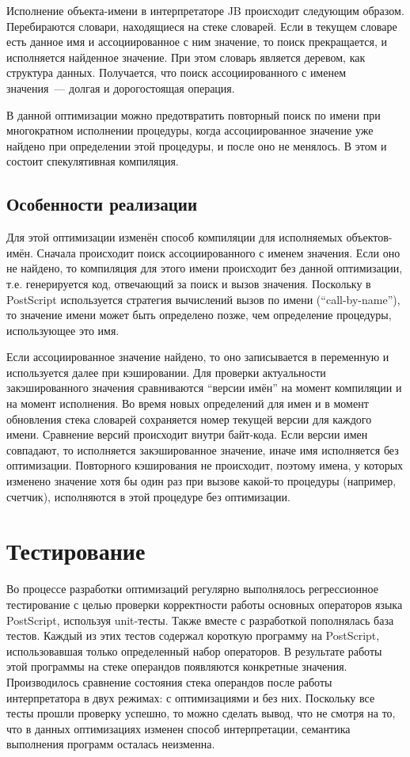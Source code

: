 	Исполнение объекта-имени в интерпретаторе JB происходит следующим образом. Перебираются словари, находящиеся на стеке словарей. Если в текущем словаре есть данное имя и ассоциированное с ним значение, то поиск прекращается, и исполняется найденное значение. При этом словарь является деревом, как структура данных. Получается, что поиск ассоциированного с именем значения~--- долгая и дорогостоящая операция. 
	
	В данной оптимизации можно предотвратить повторный поиск по имени при многократном исполнении процедуры, когда  ассоциированное значение уже найдено при определении этой процедуры, и после оно не менялось. В этом и состоит спекулятивная компиляция.
	
	\subsection{Особенности реализации}
	Для этой оптимизации изменён способ компиляции для исполняемых объектов-имён. Сначала происходит поиск ассоциированного с именем значения. Если оно не найдено, то компиляция для этого имени происходит без данной оптимизации, т.е. генерируется код, отвечающий за поиск и вызов значения. Поскольку в PostScript используется стратегия вычислений вызов по имени (``call-by-name''), то значение имени может быть определено позже, чем определение процедуры, использующее это имя.
	
	Если ассоциированное значение найдено, то оно записывается в переменную и используется далее при кэшировании.
	Для проверки актуальности закэшированного значения сравниваются ``версии имён'' на момент компиляции и на момент исполнения. Во время новых определений для имен и в момент обновления стека словарей сохраняется номер текущей версии для каждого имени. Сравнение версий происходит внутри байт-кода. Если версии имен совпадают, то исполняется закэшированное значение, иначе имя исполняется без оптимизации. Повторного кэширования не происходит, поэтому имена, у которых изменено значение хотя бы один раз при вызове какой-то процедуры (например, счетчик), исполняются в этой процедуре без оптимизации. 
	
	
	\section{Тестирование}
	Во процессе разработки оптимизаций регулярно выполнялось регрессионное тестирование с целью проверки корректности работы основных операторов языка PostScript, используя unit-тесты. Также вместе с разработкой пополнялась база тестов. Каждый из этих тестов содержал короткую программу на PostScript, использовавшая только определенный набор операторов. В результате работы этой программы на стеке операндов появляются конкретные значения. Производилось сравнение состояния стека операндов после работы интерпретатора в двух режимах: с оптимизациями и без них. Поскольку все тесты прошли проверку успешно, то можно сделать вывод, что не смотря на то, что в данных оптимизациях изменен способ интерпретации, семантика выполнения программ осталась неизменна.
	
